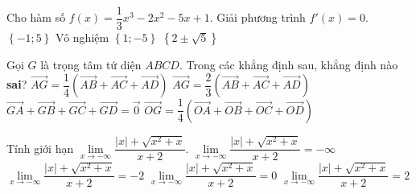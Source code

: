 \begin{ex}%
Cho hàm số $f(x)=\dfrac{1}{3}x^3-2x^2-5x+1$. Giải phương trình $f'(x)=0$.
\choice
{\True $\left\{-1;5\right\}$}
{Vô nghiệm}
{$\left\{1;-5\right\}$}
{$\left\{2\pm\sqrt{5}\right\}$}
\end{ex}

\begin{ex}%
Gọi $G$ là trọng tâm tứ diện $ABCD$. Trong các khẳng định sau, khẳng định nào \textbf{sai}?
\choice
{$\vec{AG}=\dfrac{1}{4}\left(\vec{AB}+\vec{AC}+\vec{AD}\right)$}
{\True $\vec{AG}=\dfrac{2}{3}\left(\vec{AB}+\vec{AC}+\vec{AD}\right)$}
{$\vec{GA}+\vec{GB}+\vec{GC}+\vec{GD}=\vec{0}$}
{$\vec{OG}=\dfrac{1}{4}\left(\vec{OA}+\vec{OB}+\vec{OC}+\vec{OD}\right)$}
\end{ex}

\begin{ex}%
Tính giới hạn $\lim\limits_{x\to-\infty}\dfrac{|x|+\sqrt{x^2+x}}{x+2}$.
\choice
{$\lim\limits_{x\to-\infty}\dfrac{|x|+\sqrt{x^2+x}}{x+2}=-\infty$}
{\True $\lim\limits_{x\to-\infty}\dfrac{|x|+\sqrt{x^2+x}}{x+2}=-2$}
{$\lim\limits_{x\to-\infty}\dfrac{|x|+\sqrt{x^2+x}}{x+2}=0$}
{$\lim\limits_{x\to-\infty}\dfrac{|x|+\sqrt{x^2+x}}{x+2}=2$}
\end{ex}

